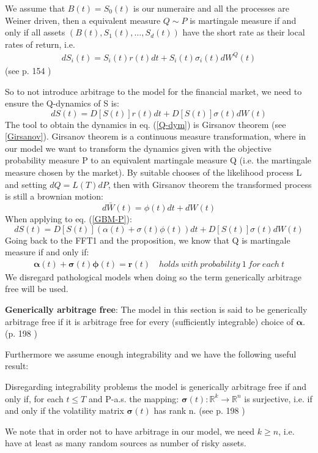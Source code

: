 \theoremstyle{proposition}
\begin{proposition}{}
We assume that $B(t)=S_0(t)$ is our numeraire and all the processes are Weiner driven, then a equivalent measure $Q \sim P$ is martingale measure if and only if all assets $(B(t), S_1(t), \ldots, S_d(t))$ have the short rate as their local rates of return, i.e.
\begin{align}
dS_i(t)=S_i(t)r(t)dt+S_i(t)\sigma_i(t)dW^Q(t)
\end{align}
(see p. 154 \parencite{finKont})
\end{proposition}
So to not introduce arbitrage to the model for the financial market, we need to ensure the Q-dynamics of S is:
\begin{equation}\label{Q-dym}
dS(t)=D[S(t)]r(t)dt+D[S(t)]\sigma(t)d{W}(t)
\end{equation}
The tool to obtain the dynamics in eq. (\ref{Q-dym}) is Girsanov theorem (see \ref{Girsanov}). Girsanov theorem is a continuous measure transformation, where in our model we want to transform the dynamics given with the objective probability measure P to an equivalent martingale measure Q (i.e. the martingale measure chosen by the market). By suitable chooses of the likelihood process L and setting $dQ=L(T)dP$, then with Girsanov theorem the transformed process is still a brownian motion:
$$d\bar{W}(t)=\phi(t)dt + dW(t)$$
When applying to eq. (\ref{GBM-P}):
$$dS(t)=D[S(t)](\alpha(t)+\sigma(t)\phi(t))dt+D[S(t)]\sigma(t)d{W}(t)$$
Going back to the FFT1 and the proposition, we know that Q is martingale measure if and only if:
\begin{align}\label{marketPriceOfRisk}
\bm{\alpha}(t)+\bm{\sigma}(t)\bm{\phi}(t)=\textbf{r}(t) \quad holds \ with \ probability \ 1 \ for \ each \ t
\end{align}
We disregard pathological models when doing so the term generically arbitrage free will be used. 

\theoremstyle{definition}
\begin{definition}{\textbf{Generically arbitrage free}:}
The model in this section is said to be generically arbitrage free if it is arbitrage free for every (sufficiently integrable) choice of $\bm{\alpha}$.
(p. 198 \parencite{finKont})
\end{definition}

Furthermore we assume enough integrability and we have the following useful result:
\theoremstyle{proposition}
\begin{proposition}{}\label{arbitrageFreeProp}
Disregarding integrability problems the model is generically arbitrage free if and only if, for each $t\leq T$ and P-a.s. the mapping:
$\bm{\sigma}(t):\mathbb{R}^k \to \mathbb{R}^n$ is surjective, i.e. if and only if the volatility matrix $\bm{\sigma}(t)$ has rank n.
(see p. 198 \parencite{finKont})
\end{proposition}
We note that in order not to have arbitrage in our model, we need $k\geq n$, i.e. have at least as many random sources as number of risky assets.

